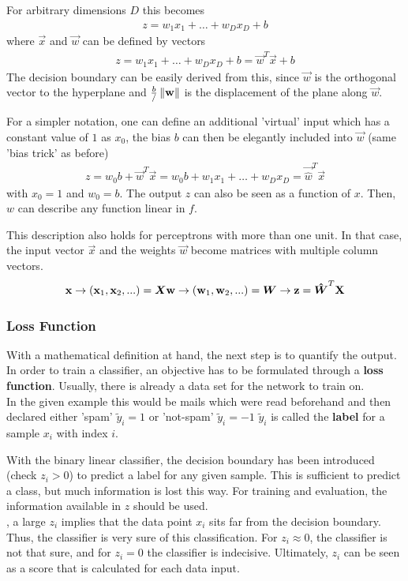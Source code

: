 For arbitrary dimensions $D$ this becomes
\begin{align}
    z = w_1 x_1 + \hdots + w_D x_D + b
\end{align}
 where $\vec{x}$ and $\vec{w}$ can be defined by vectors
\begin{align}
    z = w_1 x_1 + \hdots + w_D x_D + b = \vec{w}^T \vec{x} + b
\end{align}
The decision boundary can be easily derived from this, since $\vec{w}$ is the orthogonal vector to the hyperplane and $\frac{b}/\left\lVert\mathbf{w}\right\rVert$ is the displacement of the plane along $\vec{w}$.

For a simpler notation, one can define an additional 'virtual' input which has a constant value of $1$ as $x_0$, the bias $b$ can then be elegantly included into $\vec{w}$ (same 'bias trick' as before)
\begin{align}
    z = w_0 b + \vec{w}^T \vec{x} = w_0 b + w_1 x_1 + \hdots + w_D x_D = \vec{\hat{w}}^T \vec{x}
\end{align}
with $x_0 = 1$ and $w_0 = b$.
The output $z$ can also be seen as a function of $x$.
Then, $w$ can describe any function linear in $f$.

This description also holds for perceptrons with more than one unit.
In that case, the input vector $\vec{x}$ and the weights $\vec{w}$ become matrices with multiple column vectors.
\begin{align}
    \mathbf{x} \rightarrow (\mathbf{x}_1, \mathbf{x}_2, ...) = \boldsymbol{X}
    \mathbf{w} \rightarrow (\mathbf{w}_1, \mathbf{w}_2, ...) = \boldsymbol{W}
    \rightarrow \mathbf{z} = \boldsymbol{\hat{W}}^T \mathbf{X}
\end{align}


\subsubsection{Loss Function}
With a mathematical definition at hand, the next step is to quantify the output.
In order to train a classifier, an objective has to be formulated through a \textbf{loss function}.
Usually, there is already a data set for the network to train on.\\
In the given example this would be mails which were read beforehand and then declared either 'spam' $\tilde{y}_i = 1$ or 'not-spam' $\tilde{y}_i = -1$
$\tilde{y}_i$ is called the \textbf{label} for a sample $x_i$ with index $i$.

With the binary linear classifier, the decision boundary has been introduced (check $z_i > 0$) to predict a label for any given sample.
This is sufficient to predict a class, but much information is lost this way.
For training and evaluation, the information available in $z$ should be used.\\
\eg, a large $z_i$ implies that the data point $x_i$ sits far from the decision boundary.
Thus, the classifier is very sure of this classification.
For $z_i \approx 0$, the classifier is not that sure, and for $z_i = 0$ the classifier is indecisive.
Ultimately, $z_i$ can be seen as a score that is calculated for each data input.

